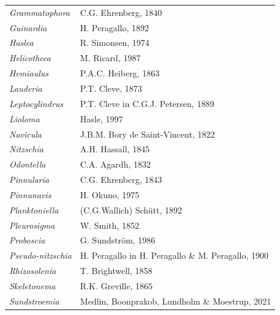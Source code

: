 \documentclass[draft]{agujournal2019}
\begin{document}
\begin{table}
{\begin{tabular}{@{}ll@{}}
\textit{Grammatophora}     & C.G. Ehrenberg, 1840                                       \\
\textit{Guinardia}         & H. Peragallo, 1892                                         \\
\textit{Haslea}            & R. Simonsen, 1974                                          \\
\textit{Helicotheca}       & M. Ricard, 1987                                            \\
\textit{Hemiaulus}         & P.A.C. Heiberg, 1863                                       \\
\textit{Lauderia}          & P.T. Cleve, 1873                                           \\
\textit{Leptocylindrus}    & P.T. Cleve in C.G.J. Petersen, 1889                        \\
\textit{Lioloma}           & Hasle, 1997                                                \\
\textit{Navicula}          & J.B.M. Bory de Saint-Vincent, 1822                         \\
\textit{Nitzschia}         & A.H. Hassall, 1845                                         \\
\textit{Odontella}         & C.A. Agardh, 1832                                          \\
\textit{Pinnularia}        & C.G. Ehrenberg, 1843                                       \\
\textit{Pinnunavis}        & H. Okuno, 1975                                             \\
\textit{Planktoniella}     & (C.G.Wallich) Schütt, 1892                                 \\
\textit{Pleurosigma}       & W. Smith, 1852                                             \\
\textit{Proboscia}         & G. Sundström, 1986                                         \\
\textit{Pseudo-nitzschia}  & H. Peragallo in H. Peragallo \& M. Peragallo, 1900         \\
\textit{Rhizosolenia}      & T. Brightwell, 1858                                        \\
\textit{Skeletonema}       & R.K. Greville, 1865                                        \\
\textit{Sundstroemia}      & Medlin, Boonprakob, Lundholm \& Moestrup, 2021             \\

\end{tabular}}
\end{table}
\end{document}
